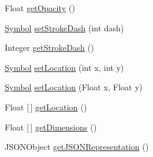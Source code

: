 \begin{DoxyCompactItemize}
\item 
Float \mbox{\hyperlink{classbridges_1_1base_1_1_symbol_a0135a9633599ee1a463f7bd83c425d02}{get\+Opacity}} ()
\item 
\mbox{\hyperlink{classbridges_1_1base_1_1_symbol}{Symbol}} \mbox{\hyperlink{classbridges_1_1base_1_1_symbol_ad36224ec7cb588dbbaa8040ef59ffbfc}{set\+Stroke\+Dash}} (int dash)
\item 
Integer \mbox{\hyperlink{classbridges_1_1base_1_1_symbol_a31ff460ae6b24ed968c1045e2533a967}{get\+Stroke\+Dash}} ()
\item 
\mbox{\hyperlink{classbridges_1_1base_1_1_symbol}{Symbol}} \mbox{\hyperlink{classbridges_1_1base_1_1_symbol_ab378b9b3c5ab203fbb4661697f7f7e0a}{set\+Location}} (int x, int y)
\item 
\mbox{\hyperlink{classbridges_1_1base_1_1_symbol}{Symbol}} \mbox{\hyperlink{classbridges_1_1base_1_1_symbol_a7d02e54c0cdfcaa7cb26176474207e39}{set\+Location}} (Float x, Float y)
\item 
Float \mbox{[}$\,$\mbox{]} \mbox{\hyperlink{classbridges_1_1base_1_1_symbol_a73b96ca5cafe7da7b38aa7e7e57fc1d4}{get\+Location}} ()
\item 
Float \mbox{[}$\,$\mbox{]} \mbox{\hyperlink{classbridges_1_1base_1_1_symbol_a68a8abc4e07c0d63dbda79b65383ee8f}{get\+Dimensions}} ()
\item 
J\+S\+O\+N\+Object \mbox{\hyperlink{classbridges_1_1base_1_1_symbol_aeba4cfa5b39fe03e72a568a8b7452e60}{get\+J\+S\+O\+N\+Representation}} ()
\end{DoxyCompactItemize}
